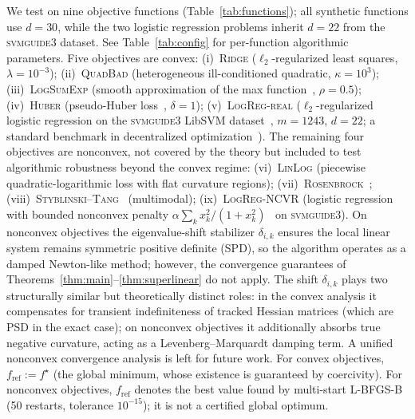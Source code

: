 \documentclass[review,onefignum,onetabnum]{siamart171218}
\begin{document}
	We test on nine objective functions
	(Table~\ref{tab:functions});
	all synthetic functions use $d{=}30$, while the two logistic regression
	problems inherit $d{=}22$ from the \textsc{svmguide3} dataset.
	See Table~\ref{tab:config} for per-function algorithmic parameters.
	Five objectives are convex:
	(i)~\textsc{Ridge} ($\ell_2$-regularized least squares, $\lambda{=}10^{-3}$);
	(ii)~\textsc{QuadBad} (heterogeneous ill-conditioned quadratic, $\kappa{=}10^3$);
	(iii)~\textsc{LogSumExp}
	(smooth approximation of the max function~\citep{nesterov2005smooth},
	$\rho{=}0.5$);
	(iv)~\textsc{Huber}
	(pseudo-Huber loss~\citep{charbonnier1997huber}, $\delta{=}1$);
	(v)~\textsc{LogReg-real} ($\ell_2$-regularized logistic regression on the
	\textsc{svmguide3} LibSVM dataset~\citep{chang2011libsvm},
	$m{=}1243$, $d{=}22$;
	a standard benchmark in decentralized
	optimization~\citep{shi2015extra,sun2022sonata}).
	The remaining four objectives are nonconvex, not covered by the theory but included
	to test algorithmic robustness beyond the convex regime:
	(vi)~\textsc{LinLog} (piecewise quadratic-logarithmic loss with flat curvature regions);
	(vii)~\textsc{Rosenbrock}~\citep{rosenbrock1960automatic};
	(viii)~\textsc{Styblinski--Tang}~\citep{styblinski1990experiments} (multimodal);
	(ix)~\textsc{LogReg-NCVR} (logistic regression with
	bounded nonconvex penalty $\alpha\sum_k x_k^2/(1{+}x_k^2)$~\citep{geman1995nonlinear}
	on \textsc{svmguide3}).
	On nonconvex objectives the eigenvalue-shift stabilizer $\delta_{i,k}$
	ensures the local linear system remains symmetric positive definite (SPD), so the algorithm operates
	as a damped Newton-like method; however, the convergence
	guarantees of Theorems~\ref{thm:main}--\ref{thm:superlinear} do
	not apply.
	The shift $\delta_{i,k}$ plays two structurally similar but
	theoretically distinct roles:
	in the convex analysis it compensates for transient indefiniteness of
	tracked Hessian matrices (which are PSD in the exact case);
	on nonconvex objectives it additionally absorbs true negative
	curvature, acting as a Levenberg--Marquardt damping term.
	A unified nonconvex convergence analysis is left for future work.
	For convex objectives, $f_{\mathrm{ref}}:=f^\star$ (the global minimum,
	whose existence is guaranteed by coercivity).
	For nonconvex objectives, $f_{\mathrm{ref}}$ denotes the best value
	found by multi-start L-BFGS-B (50 restarts, tolerance $10^{-15}$);
	it is not a certified global optimum.
	
\end{document}

